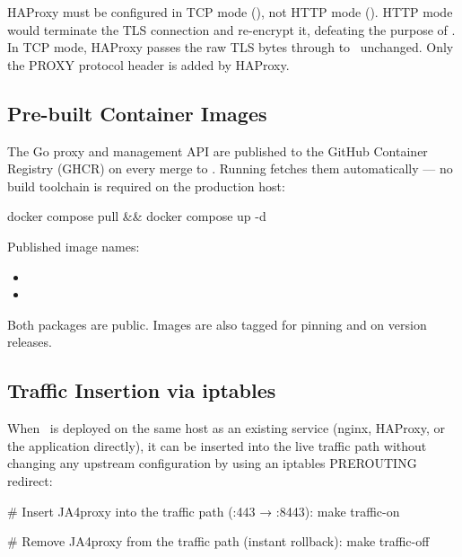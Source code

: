 \begin{warningbox}
HAProxy must be configured in TCP mode (), not HTTP mode
(). HTTP mode would terminate the TLS connection and re-encrypt it,
defeating the purpose of \ja. In TCP mode, HAProxy passes the raw TLS bytes through
to \ja\ unchanged. Only the PROXY protocol header is added by HAProxy.
\end{warningbox}

\subsection{Pre-built Container Images}

The Go proxy and management API are published to the GitHub Container Registry
(GHCR) on every merge to . Running  fetches
them automatically — no build toolchain is required on the production host:

\begin{bashcode}
docker compose pull && docker compose up -d
\end{bashcode}

Published image names:
\begin{itemize}
  \item {}
  \item {}
\end{itemize}

Both packages are public. Images are also tagged  for
pinning and  on version releases.

\subsection{Traffic Insertion via iptables}

When \ja\ is deployed on the same host as an existing service (nginx, HAProxy,
or the application directly), it can be inserted into the live traffic path
without changing any upstream configuration by using an iptables PREROUTING
redirect:

\begin{bashcode}
# Insert JA4proxy into the traffic path (:443 → :8443):
make traffic-on

# Remove JA4proxy from the traffic path (instant rollback):
make traffic-off
\end{bashcode}

